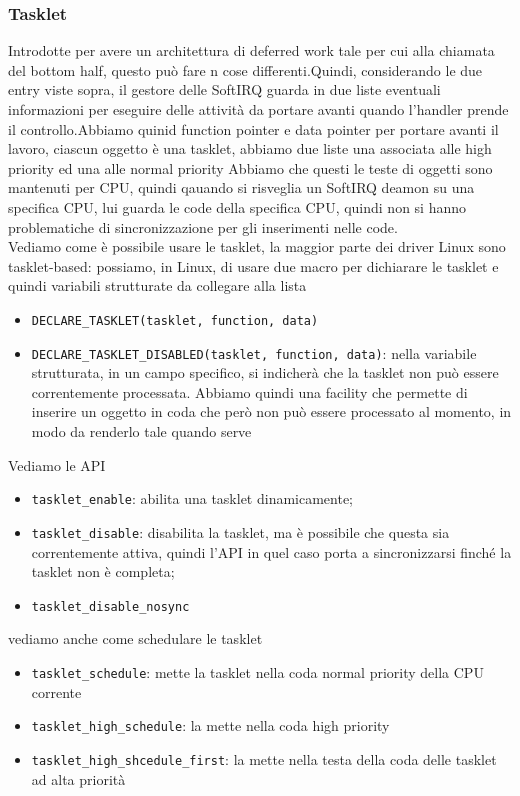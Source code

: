 \documentclass[12pt, oneside]{extbook}
\begin{document}
\subsubsection{Tasklet}
Introdotte per avere un architettura di deferred work tale per cui alla chiamata del bottom half, questo può fare n cose differenti.Quindi, considerando le due entry viste sopra, il gestore delle SoftIRQ guarda in due liste eventuali informazioni per eseguire delle attività da portare avanti quando l'handler prende il controllo.Abbiamo quinid function pointer e data pointer per portare avanti il lavoro, ciascun oggetto è una tasklet, abbiamo due liste una associata alle high priority ed una alle normal priority
Abbiamo che questi le teste di oggetti sono mantenuti per CPU, quindi qauando si risveglia un SoftIRQ deamon su una specifica CPU, lui guarda le code
della specifica CPU, quindi non si hanno problematiche di sincronizzazione per gli inserimenti nelle code.\\Vediamo come è possibile usare le tasklet, la maggior parte dei driver Linux sono tasklet-based: possiamo, in Linux, di usare due macro per dichiarare le tasklet e quindi variabili strutturate da collegare alla lista
\begin{itemize}
\item \texttt{DECLARE\_TASKLET(tasklet, function, data)}
\item \texttt{DECLARE\_TASKLET\_DISABLED(tasklet, function, data)}: nella variabile strutturata, in un campo specifico, si indicherà che la tasklet non può essere correntemente processata. Abbiamo quindi una facility che permette di inserire un oggetto in coda che però non può essere processato al momento, in modo da renderlo tale quando serve
\end{itemize}
Vediamo le API
\begin{itemize}
\item \texttt{tasklet\_enable}: abilita una tasklet dinamicamente;
\item \texttt{tasklet\_disable}: disabilita la tasklet, ma è possibile che questa sia correntemente attiva, quindi l'API in quel caso porta a sincronizzarsi finché la tasklet non è completa;
\item \texttt{tasklet\_disable\_nosync}
\end{itemize}
vediamo anche come schedulare le tasklet
\begin{itemize}
\item \texttt{tasklet\_schedule}: mette la tasklet nella coda normal priority della CPU corrente
\item \texttt{tasklet\_high\_schedule}: la mette nella coda high priority
\item \texttt{tasklet\_high\_shcedule\_first}: la mette nella testa della coda delle tasklet ad alta priorità
\end{itemize}
\end{document}
